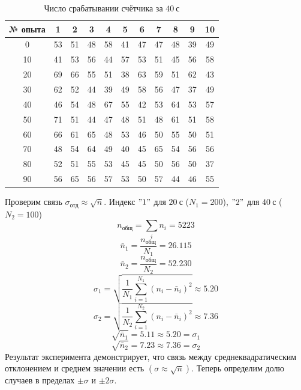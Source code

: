 \documentclass[a4paper, 12pt]{article}
\begin{document}
	\begin{table}[!ht]
		\centering
		\begin{tabular}{|c|c|c|c|c|c|c|c|c|c|c|}
			\hline
			№ опыта & 1  & 2  & 3  & 4  & 5  & 6  & 7  & 8  & 9  & 10 \\ \hline
			   0    & 53 & 51 & 48 & 58 & 41 & 47 & 47 & 48 & 39 & 49 \\
			  10    & 41 & 53 & 56 & 44 & 57 & 53 & 51 & 45 & 56 & 58 \\
			  20    & 69 & 66 & 55 & 51 & 38 & 63 & 59 & 51 & 62 & 43 \\
			  30    & 62 & 52 & 44 & 39 & 49 & 58 & 56 & 47 & 37 & 49 \\
			  40    & 46 & 54 & 48 & 67 & 55 & 42 & 53 & 64 & 53 & 57 \\
			  50    & 71 & 51 & 44 & 47 & 48 & 51 & 48 & 61 & 51 & 58 \\
			  60    & 66 & 61 & 65 & 48 & 53 & 46 & 50 & 55 & 50 & 51 \\
			  70    & 48 & 54 & 64 & 49 & 40 & 45 & 65 & 54 & 56 & 56 \\
			  80    & 52 & 51 & 55 & 53 & 45 & 45 & 50 & 56 & 50 & 37 \\
			  90    & 56 & 65 & 56 & 57 & 53 & 50 & 57 & 44 & 46 & 55 \\ \hline
		\end{tabular}
		\caption{Число срабатывании счётчика за $40 \ с$}
		\label{40c}
	\end{table}

	\newpage
	Проверим связь $\sigma_{отд}\approx \sqrt{\bar{n}}$. Индекс $"1"$ для $20 \ с$ ($ N_1 = 200 $), $"2"$ для $40 \ с$ ($ N_2 = 100 $)
	\[n_{общ} = \sum_i n_i = 5223\]
	\[\bar{n}_1 = \frac{n_{общ}}{N_1} = 26.115\]
	\[\bar{n}_2 = \frac{n_{общ}}{N_2} = 52.230\]
	\[\sigma_{1}=\sqrt{\frac{1}{N_1} \sum_{i=1}^{N_1} (n_i - \bar{n}_i)^2} \approx 5.20\]
	\[\sigma_{2}=\sqrt{\frac{1}{N_2} \sum_{i=1}^{N_2} (n_i - \bar{n}_i)^2} \approx 7.36\]
	\[\sqrt{\bar{n}_1} = 5.11 \approx 5.20 = \sigma_1\]
	\[\sqrt{\bar{n}_2} = 7.23 \approx 7.36 = \sigma_2\]
    Результат эксперимента демонстрирует, что связь между среднеквадратическим отклонением и среднем значении есть $(\sigma \approx \sqrt{\bar{n}})$.
    Теперь определим долю случаев в пределах $\pm\sigma$ и $\pm2\sigma$.
\end{document}
